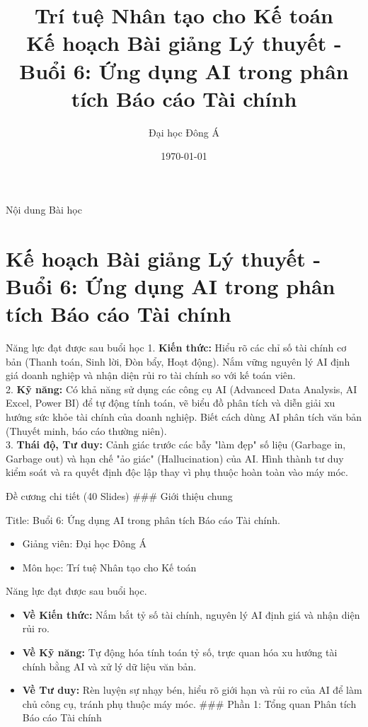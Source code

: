\documentclass[aspectratio=169]{beamer}
\title[Trí tuệ Nhân tạo cho Kế toán]{Trí tuệ Nhân tạo cho Kế toán \\ \vspace{0.3cm} \Large Kế hoạch Bài giảng Lý thuyết - Buổi 6: Ứng dụng AI trong phân tích Báo cáo Tài chính}
\author{Đại học Đông Á}
\date{\today}
\begin{document}
\begin{frame}
    \titlepage
\end{frame}

\begin{frame}{Nội dung Bài học}
    \tableofcontents
\end{frame}


\section{Kế hoạch Bài giảng Lý thuyết - Buổi 6: Ứng dụng AI trong phân tích Báo cáo Tài chính}


\begin{frame}{Năng lực đạt được sau buổi học}
    1. \textbf{Kiến thức:} Hiểu rõ các chỉ số tài chính cơ bản (Thanh toán, Sinh lời, Đòn bẩy, Hoạt động). Nắm vững nguyên lý AI định giá doanh nghiệp và nhận diện rủi ro tài chính so với kế toán viên.\\
    2. \textbf{Kỹ năng:} Có khả năng sử dụng các công cụ AI (Advanced Data Analysis, AI Excel, Power BI) để tự động tính toán, vẽ biểu đồ phân tích và diễn giải xu hướng sức khỏe tài chính của doanh nghiệp. Biết cách dùng AI phân tích văn bản (Thuyết minh, báo cáo thường niên).\\
    3. \textbf{Thái độ, Tư duy:} Cảnh giác trước các bẫy "làm đẹp" số liệu (Garbage in, Garbage out) và hạn chế "ảo giác" (Hallucination) của AI. Hình thành tư duy kiểm soát và ra quyết định độc lập thay vì phụ thuộc hoàn toàn vào máy móc.\\
\end{frame}


\begin{frame}{Đề cương chi tiết (40 Slides)}
    ### Giới thiệu chung\\
\end{frame}


\begin{frame}{Title: Buổi 6: Ứng dụng AI trong phân tích Báo cáo Tài chính.}
    \begin{itemize}
        \item Giảng viên: Đại học Đông Á
        \item Môn học: Trí tuệ Nhân tạo cho Kế toán
    \end{itemize}
\end{frame}


\begin{frame}{Năng lực đạt được sau buổi học.}
    \begin{itemize}
        \item \textbf{Về Kiến thức:} Nắm bắt tỷ số tài chính, nguyên lý AI định giá và nhận diện rủi ro.
        \item \textbf{Về Kỹ năng:} Tự động hóa tính toán tỷ số, trực quan hóa xu hướng tài chính bằng AI và xử lý dữ liệu văn bản.
        \item \textbf{Về Tư duy:} Rèn luyện sự nhạy bén, hiểu rõ giới hạn và rủi ro của AI để làm chủ công cụ, tránh phụ thuộc máy móc.
        ### Phần 1: Tổng quan Phân tích Báo cáo Tài chính
    \end{itemize}
\end{frame}
\end{document}
